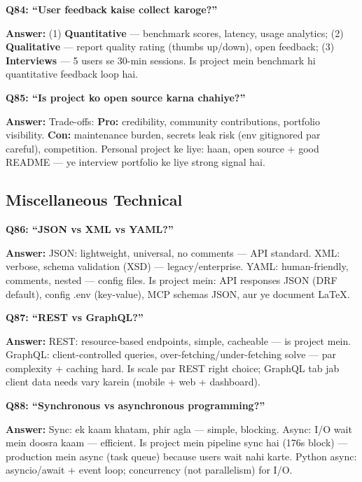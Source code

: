 \begin{interviewbox}
\textbf{Q84: ``User feedback kaise collect karoge?''}

\textbf{Answer:} (1) \textbf{Quantitative} --- benchmark scores, latency, usage analytics; (2) \textbf{Qualitative} --- report quality rating (thumbs up/down), open feedback; (3) \textbf{Interviews} --- 5 users se 30-min sessions. Is project mein benchmark hi quantitative feedback loop hai.
\end{interviewbox}

\begin{interviewbox}
\textbf{Q85: ``Is project ko open source karna chahiye?''}

\textbf{Answer:} Trade-offs: \textbf{Pro:} credibility, community contributions, portfolio visibility. \textbf{Con:} maintenance burden, secrets leak risk (env gitignored par careful), competition. Personal project ke liye: haan, open source + good README --- ye interview portfolio ke liye strong signal hai.
\end{interviewbox}

\subsection{Miscellaneous Technical}

\begin{interviewbox}
\textbf{Q86: ``JSON vs XML vs YAML?''}

\textbf{Answer:} JSON: lightweight, universal, no comments --- API standard. XML: verbose, schema validation (XSD) --- legacy/enterprise. YAML: human-friendly, comments, nested --- config files. Is project mein: API responses JSON (DRF default), config .env (key-value), MCP schemas JSON, aur ye document LaTeX.
\end{interviewbox}

\begin{interviewbox}
\textbf{Q87: ``REST vs GraphQL?''}

\textbf{Answer:} REST: resource-based endpoints, simple, cacheable --- is project mein. GraphQL: client-controlled queries, over-fetching/under-fetching solve --- par complexity + caching hard. Is scale par REST right choice; GraphQL tab jab client data needs vary karein (mobile + web + dashboard).
\end{interviewbox}

\begin{interviewbox}
\textbf{Q88: ``Synchronous vs asynchronous programming?''}

\textbf{Answer:} Sync: ek kaam khatam, phir agla --- simple, blocking. Async: I/O wait mein doosra kaam --- efficient. Is project mein pipeline sync hai (176s block) --- production mein async (task queue) because users wait nahi karte. Python async: asyncio/await + event loop; concurrency (not parallelism) for I/O.
\end{interviewbox}

